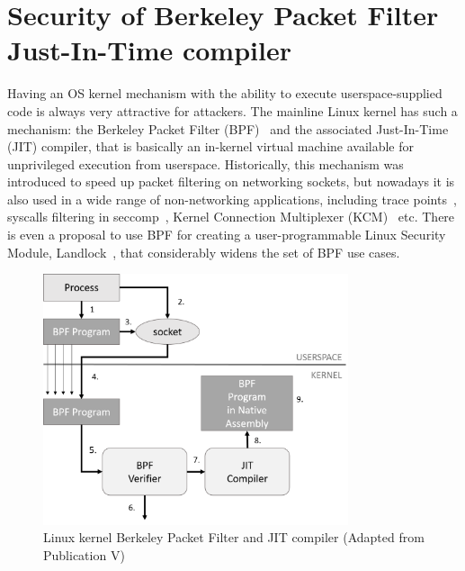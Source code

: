 \section{Security of Berkeley Packet Filter Just-In-Time compiler}
\label{sec:bpf-jit-attack}

Having an OS kernel mechanism with the ability to execute userspace-supplied code is always very attractive for attackers. 
The mainline Linux kernel has such a mechanism: the Berkeley Packet Filter (BPF)~\cite{kernelfilter2016} and the associated Just-In-Time (JIT) compiler, that is basically an in-kernel virtual machine available for unprivileged execution from userspace. Historically, this mechanism was introduced to speed up packet filtering on networking sockets, but nowadays it is also used in a wide range of non-networking applications, including trace points~\cite{starovoitov2015}, syscalls filtering in seccomp~\cite{seccomp2016}, Kernel Connection Multiplexer (KCM)~\cite{corbet2015} etc. There is even a proposal to use BPF for creating a user-programmable Linux Security Module, Landlock~\cite{landlock2016}, that considerably widens the set of BPF use cases.

\begin{figure}[t]
	\centering
		\includegraphics[width=0.80\textwidth]{figures/bpf-overview.png}
	\caption{Linux kernel Berkeley Packet Filter and JIT compiler (Adapted from Publication V)}
	\label{fig:bpf-overview}
\end{figure}



